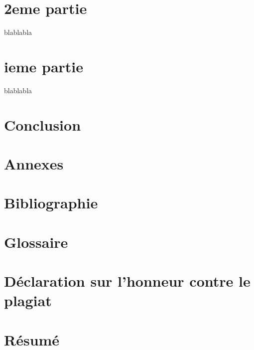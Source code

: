 \documentclass[11pt]{article}
\begin{document}
\section{2eme partie}
blablabla
\section{ieme partie}
blablabla
\section*{Conclusion}
\newpage

\section*{Annexes}

\section*{Bibliographie}
\newpage

\section*{Glossaire}

\section*{Déclaration sur l'honneur contre le plagiat}

\newpage

\newpage
\section*{Résumé}
\end{document}
